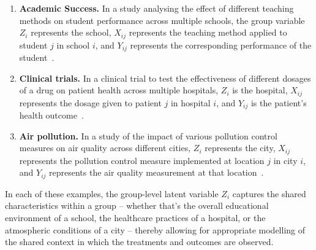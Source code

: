 \documentclass[backrefs]{cam-thesis}
\newcommand{\crit}[1]{\textcolor{red}{#1}}
\begin{document}
\begin{enumerate}
    \item \textbf{Academic Success.} In a study analysing the effect of different teaching methods on student performance across multiple schools, the group variable $Z_i$ represents the school, $X_{ij}$ represents the teaching method applied to student $j$ in school $i$, and $Y_{ij}$ represents the corresponding performance of the student~\citep{Raudenbush1992HierarchicalLM}.
    \item \textbf{Clinical trials.} In a clinical trial to test the effectiveness of different dosages of a drug on patient health across multiple hospitals, $Z_i$ is the hospital, $X_{ij}$ represents the dosage given to patient $j$ in hospital $i$, and $Y_{ij}$ is the patient's health outcome~\citep{Pinheiro2001MixedEffectsMI}.
    \item \textbf{Air pollution.} In a study of the impact of various pollution control measures on air quality across different cities, $Z_i$ represents the city, $X_{ij}$ represents the pollution control measure implemented at location $j$ in city $i$, and $Y_{ij}$ represents the air quality measurement at that location~\citep{Cressie2011StatisticsFS}.
\end{enumerate}

In each of these examples, the group-level latent variable $Z_i$ captures the shared characteristics within a group -- whether that's the overall educational environment of a school, the healthcare practices of a hospital, or the atmospheric conditions of a city -- thereby allowing for appropriate modelling of the shared context in which the treatments and outcomes are observed.

\end{document}
